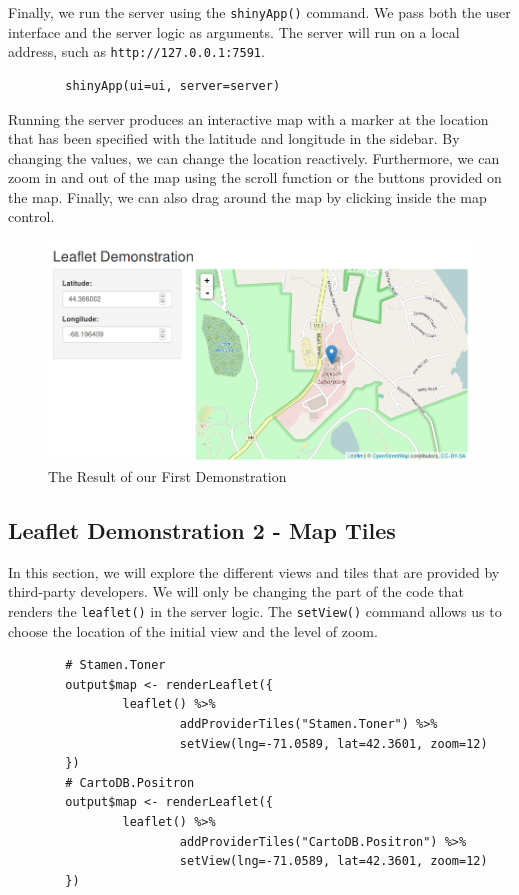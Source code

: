 	Finally, we run the server using the \texttt{shinyApp()} command.
        We pass both the user interface and the server logic as arguments.
        The server will run on a local address, such as \texttt{http://127.0.0.1:7591}. 
	
        \begin{lstlisting}
        shinyApp(ui=ui, server=server)
        \end{lstlisting}

	Running the server produces an interactive map with a marker at the location that has been specified with the latitude and longitude in the sidebar.
        By changing the values, we can change the location reactively.
        Furthermore, we can zoom in and out of the map using the scroll function or the buttons provided on the map.
        Finally, we can also drag around the map by clicking inside the map control.
	
	\begin{figure}[htbp!]
		\centering
		\includegraphics[width=12cm]{pictures/html/htmlwidgets-image-1.png}
		\caption{The Result of our First Demonstration}
	\end{figure}

	\subsection{Leaflet Demonstration 2 - Map Tiles}
	
	In this section, we will explore the different views and tiles that are provided by third-party developers.
        We will only be changing the part of the code that renders the \texttt{leaflet()} in the server logic.
        The \texttt{setView()} command allows us to choose the location of the initial view and the level of zoom.
	
        \begin{lstlisting}
        # Stamen.Toner
        output$map <- renderLeaflet({
                leaflet() %>%
                        addProviderTiles("Stamen.Toner") %>%
                        setView(lng=-71.0589, lat=42.3601, zoom=12)
        })
        # CartoDB.Positron
        output$map <- renderLeaflet({
                leaflet() %>%
                        addProviderTiles("CartoDB.Positron") %>%
                        setView(lng=-71.0589, lat=42.3601, zoom=12)
        })
        \end{lstlisting}

